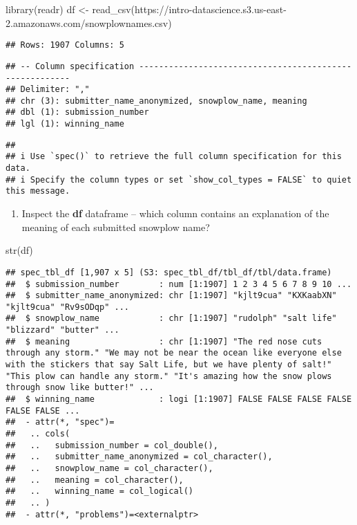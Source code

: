 \documentclass[
]{article}
\newenvironment{Shaded}{\begin{snugshade}}{\end{snugshade}}
\newcommand{\FunctionTok}[1]{\textcolor[rgb]{0.00,0.00,0.00}{#1}}
\newcommand{\NormalTok}[1]{#1}
\newcommand{\OtherTok}[1]{\textcolor[rgb]{0.56,0.35,0.01}{#1}}
\newcommand{\StringTok}[1]{\textcolor[rgb]{0.31,0.60,0.02}{#1}}
\providecommand{\tightlist}{%
  \setlength{\itemsep}{0pt}\setlength{\parskip}{0pt}}
\begin{document}
\begin{Shaded}
\begin{Highlighting}[]
\FunctionTok{library}\NormalTok{(readr)}
\NormalTok{df }\OtherTok{\textless{}{-}} \FunctionTok{read\_csv}\NormalTok{(}\StringTok{\textquotesingle{}https://intro{-}datascience.s3.us{-}east{-}2.amazonaws.com/snowplownames.csv\textquotesingle{}}\NormalTok{)}
\end{Highlighting}
\end{Shaded}

\begin{verbatim}
## Rows: 1907 Columns: 5
\end{verbatim}

\begin{verbatim}
## -- Column specification --------------------------------------------------------
## Delimiter: ","
## chr (3): submitter_name_anonymized, snowplow_name, meaning
## dbl (1): submission_number
## lgl (1): winning_name
\end{verbatim}

\begin{verbatim}
## 
## i Use `spec()` to retrieve the full column specification for this data.
## i Specify the column types or set `show_col_types = FALSE` to quiet this message.
\end{verbatim}

\begin{enumerate}
\def\labelenumi{\Alph{enumi}.}
\setcounter{enumi}{2}
\tightlist
\item
  Inspect the \textbf{df} dataframe -- which column contains an
  explanation of the meaning of each submitted snowplow name?
\end{enumerate}

\begin{Shaded}
\begin{Highlighting}[]
\FunctionTok{str}\NormalTok{(df)}
\end{Highlighting}
\end{Shaded}

\begin{verbatim}
## spec_tbl_df [1,907 x 5] (S3: spec_tbl_df/tbl_df/tbl/data.frame)
##  $ submission_number        : num [1:1907] 1 2 3 4 5 6 7 8 9 10 ...
##  $ submitter_name_anonymized: chr [1:1907] "kjlt9cua" "KXKaabXN" "kjlt9cua" "Rv9sODqp" ...
##  $ snowplow_name            : chr [1:1907] "rudolph" "salt life" "blizzard" "butter" ...
##  $ meaning                  : chr [1:1907] "The red nose cuts through any storm." "We may not be near the ocean like everyone else with the stickers that say Salt Life, but we have plenty of salt!" "This plow can handle any storm." "It's amazing how the snow plows through snow like butter!" ...
##  $ winning_name             : logi [1:1907] FALSE FALSE FALSE FALSE FALSE FALSE ...
##  - attr(*, "spec")=
##   .. cols(
##   ..   submission_number = col_double(),
##   ..   submitter_name_anonymized = col_character(),
##   ..   snowplow_name = col_character(),
##   ..   meaning = col_character(),
##   ..   winning_name = col_logical()
##   .. )
##  - attr(*, "problems")=<externalptr>
\end{verbatim}
\end{document}
